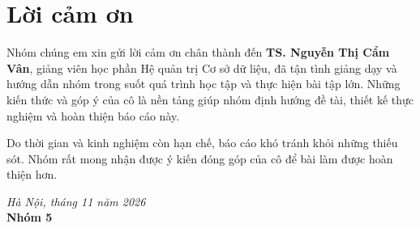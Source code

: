 \clearpage
{}
{}
\chapter*{Lời cảm ơn}

Nhóm chúng em xin gửi lời cảm ơn chân thành đến \textbf{TS. Nguyễn Thị Cẩm Vân}, giảng viên học phần Hệ quản trị Cơ sở dữ liệu, đã tận tình giảng dạy và hướng dẫn nhóm trong suốt quá trình học tập và thực hiện bài tập lớn. Những kiến thức và góp ý của cô là nền tảng giúp nhóm định hướng đề tài, thiết kế thực nghiệm và hoàn thiện báo cáo này.

Do thời gian và kinh nghiệm còn hạn chế, báo cáo khó tránh khỏi những thiếu sót. Nhóm rất mong nhận được ý kiến đóng góp của cô để bài làm được hoàn thiện hơn.

\begin{flushright}
\textit{Hà Nội, tháng 11 năm 2026}\\
\textbf{Nhóm 5}
\end{flushright}
